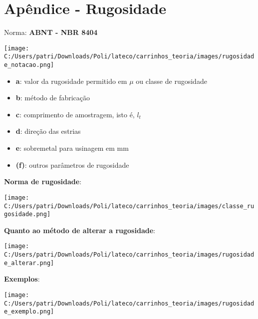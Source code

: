 \section*{Apêndice - Rugosidade}

Norma: \textbf{ABNT - NBR 8404}

\begin{center}
\texttt{[image: C:/Users/patri/Downloads/Poli/lateco/carrinhos\_teoria/images/rugosidade\_notacao.png]}
\end{center}

\begin{itemize}
	\item \textbf{a}: valor da rugosidade permitido em $\mu$ ou classe de rugosidade
	\item \textbf{b}: método de fabricação
	\item \textbf{c}: comprimento de amostragem, isto é, $l_t$
	\item \textbf{d}: direção das estrias
	\item \textbf{e}: sobremetal para usinagem em mm
	\item \textbf{(f)}: outros parâmetros de rugosidade
\end{itemize}

\textbf{Norma de rugosidade}:

\begin{center}
\texttt{[image: C:/Users/patri/Downloads/Poli/lateco/carrinhos\_teoria/images/classe\_rugosidade.png]}
\end{center}

\textbf{Quanto ao método de alterar a rugosidade}:
\begin{center}
\texttt{[image: C:/Users/patri/Downloads/Poli/lateco/carrinhos\_teoria/images/rugosidade\_alterar.png]}
\end{center}

\textbf{Exemplos}:
\begin{center}
\texttt{[image: C:/Users/patri/Downloads/Poli/lateco/carrinhos\_teoria/images/rugosidade\_exemplo.png]}
\end{center}
